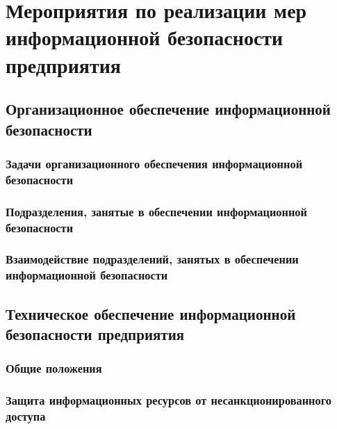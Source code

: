 
\section{Мероприятия по реализации мер информационной безопасности предприятия}
\label{sec:measures}


\subsection{Организационное обеспечение информационной безопасности}
\label{subsec:measures:organisational}

\subsubsection{Задачи организационного обеспечения информационной безопасности}
\label{subsubsec:measures:organisational:tasks}

\subsubsection{Подразделения, занятые в обеспечении информационной безопасности}
\label{subsubsec:measures:organisational:units}

\subsubsection{Взаимодействие подразделений, занятых в обеспечении информационной безопасности}
\label{subsubsec:measures:organisational:intercommunication}


\subsection{Техническое обеспечение информационной безопасности предприятия}
\label{subsec:measures:technical}

\subsubsection{Общие положения}
\label{subsubsec:measures:techical:general}

\subsubsection{Защита информационных ресурсов от несанкционированного доступа}
\label{subsubsec:measures:techical:protection}

